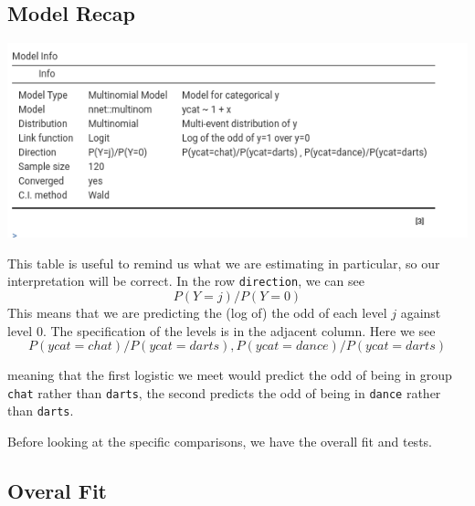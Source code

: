 \documentclass[
]{book}
\begin{document}
\hypertarget{model-recap-2}{%
\subsection{Model Recap}\label{model-recap-2}}

\includegraphics[width=8.06in]{bookletpics/3_multi_output2}

This table is useful to remind us what we are estimating in particular, so our interpretation will be correct. In the row \texttt{direction}, we can see
\[
P(Y=j)/P(Y=0)
\]
This means that we are predicting the (log of) the odd of each level \(j\) against level 0. The specification of the levels is in the adjacent column. Here we see
\[
P(ycat=chat)/P(ycat=darts), P(ycat=dance)/P(ycat=darts) 
\]

meaning that the first logistic we meet would predict the odd of being in group \texttt{chat} rather than \texttt{darts}, the second predicts the odd of being in \texttt{dance} rather than \texttt{darts}.

Before looking at the specific comparisons, we have the overall fit and tests.

\hypertarget{overal-fit}{%
\subsection{Overal Fit}\label{overal-fit}}
\end{document}
